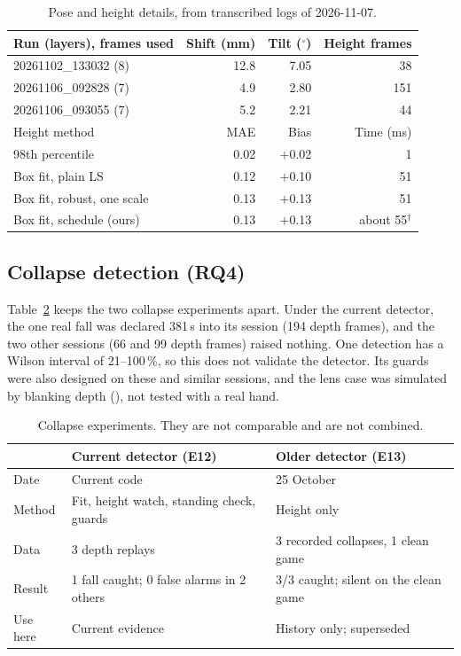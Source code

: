 \documentclass[conference,10pt]{IEEEtran}
\newcommand{\code}[1]{\texttt{\small\detokenize{#1}}}
\begin{document}
\begin{table}[!t]
\caption{Pose and height details, from transcribed logs of 2026-11-07.}\label{tab:posedetail}
\centering\footnotesize
\begin{tabular}{@{}p{3.15cm}rrr@{}}
\toprule
Run (layers), frames used & Shift (mm) & Tilt ($^\circ$) & Height frames \\
\midrule
20261102\_133032 (8) & 12.8 & 7.05 & 38 \\
20261106\_092828 (7) & 4.9 & 2.80 & 151 \\
20261106\_093055 (7) & 5.2 & 2.21 & 44 \\
\midrule
Height method & MAE & Bias & Time (ms) \\
\midrule
98th percentile & 0.02 & $+$0.02 & 1 \\
Box fit, plain LS & 0.12 & $+$0.10 & 51 \\
Box fit, robust, one scale & 0.13 & $+$0.13 & 51 \\
Box fit, schedule (ours) & 0.13 & $+$0.13 & about 55$^\dagger$ \\
\bottomrule
\end{tabular}

\vspace{2pt}{\footnotesize Shift is the vector norm of the logged correction. $^\dagger$The log records 2557\,ms, which the log's header calls a one-off slowdown; a separate re-timing gave about 55\,ms.}
\end{table}

\subsection{Collapse detection (RQ4)}
Table~\ref{tab:collapse} keeps the two collapse experiments apart. Under the current detector, the one real fall was declared 381\,s into its session (194 depth frames), and the two other sessions (66 and 99 depth frames) raised nothing. One detection has a Wilson interval of 21--100\,\%, so this does not validate the detector. Its guards were also designed on these and similar sessions, and the lens case was simulated by blanking depth (\code{COVER_S}), not tested with a real hand.

\begin{table}[!t]
\caption{Collapse experiments. They are not comparable and are not combined.}\label{tab:collapse}
\centering\footnotesize
\begin{tabular}{@{}p{1.4cm}p{2.85cm}p{3.5cm}@{}}
\toprule
 & Current detector (E12) & Older detector (E13) \\
\midrule
Date & Current code & 25 October \\
Method & Fit, height watch, standing check, guards & Height only \\
Data & 3 depth replays & 3 recorded collapses, 1 clean game \\
Result & 1 fall caught; 0 false alarms in 2 others & 3/3 caught; silent on the clean game \\
Use here & Current evidence & History only; superseded \\
\bottomrule
\end{tabular}
\end{table}
\end{document}
